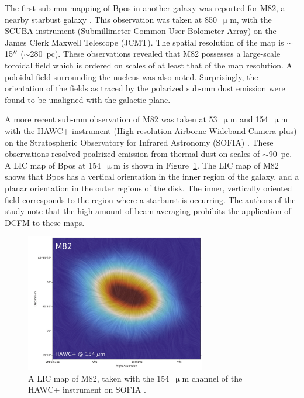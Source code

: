 The first sub-mm mapping of \gls{Bpos} in another galaxy was reported for M82, a nearby starbust galaxy \citep{greaves2000magnetic}. This observation was taken at 850~$\upmu$m, with the SCUBA instrument (Submillimeter Common User Bolometer Array) on the James Clerk Maxwell Telescope (JCMT). The spatial resolution of the map is $\sim$15$\operatorname{^{\prime\prime}}$ ($\sim$280~pc). These observations revealed that M82 possesses a large-scale toroidal field which is ordered on scales of at least that of the map resolution. A poloidal field surrounding the nucleus was also noted. Surprisingly, the orientation of the fields as traced by the polarized sub-mm dust emission were found to be unaligned with the galactic plane.

A more recent sub-mm observation of M82 was taken at 53~$\upmu$m and 154~$\upmu$m with the HAWC+ instrument (High-resolution Airborne Wideband Camera-plus) on the Stratospheric Observatory for Infrared Astronomy (SOFIA) \citep{jones2019sofia}. These observations resolved poalrized emission from thermal dust on scales of $\sim$90~pc. A LIC map of \gls{Bpos} at 154~$\upmu$m is shown in Figure~\ref{fig:m82 lic}. The LIC map of M82 shows that \gls{Bpos} has a vertical orientation in the inner region of the galaxy, and a planar orientation in the outer regions of the disk. The inner, vertically oriented field corresponds to the region where a starburst is occurring. The authors of the study note that the high amount of beam-averaging prohibits the application of DCFM to these maps.

\begin{figure}[!htbp]
\centering
\includegraphics[width=0.7\textwidth]{figures/galaxies/m82_lic_cropped}
\caption[A LIC map of M82, taken with the  channel of the HAWC+ instrument on SOFIA.]{A LIC map of M82, taken with the 154~$\upmu$m channel of the HAWC+ instrument on SOFIA \citep{jones2019sofia}.}
\label{fig:m82 lic}
\end{figure}

